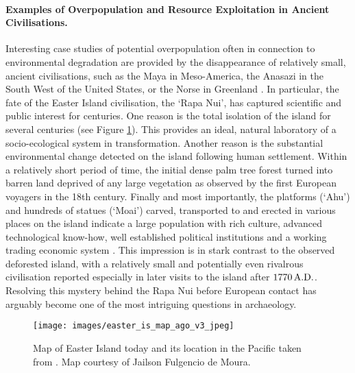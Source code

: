 \paragraph{Examples of Overpopulation and Resource Exploitation in Ancient Civilisations.}
Interesting case studies of potential overpopulation often in connection to environmental degradation are provided by the disappearance of relatively small, ancient civilisations, such as the Maya in Meso-America, the Anasazi in the South West of the United States, or the Norse in Greenland \citep{Diamond2011}.
In particular, the fate of the Easter Island civilisation, the `Rapa Nui', has captured scientific and public interest for centuries.
One reason is the total isolation of the island for several centuries (see Figure \ref{fig:Karte}).
This provides an ideal, natural laboratory of a socio-ecological system in transformation. 
Another reason is the substantial environmental change detected on the island following human settlement.  
Within a relatively short period of time, the initial dense palm tree forest turned into barren land deprived of any large vegetation as observed by the first European voyagers in the 18th century.
Finally and most importantly, the platforms (`Ahu') and hundreds of statues (`Moai') carved, transported to and erected in various places on the island indicate a large population with rich culture, advanced technological know-how, well established political institutions and a working trading economic system \citep{Cauwe2011}.
This impression is in stark contrast to the observed deforested island, with a relatively small and potentially even rivalrous civilisation reported especially in later visits to the island after $1770\, {\rm A.D.}$.
Resolving this mystery behind the Rapa Nui before European contact has arguably become one of the most intriguing questions in archaeology.


\begin{figure}
	\centering
	\texttt{[image: images/easter\_is\_map\_ago\_v3\_jpeg]}
	\caption{Map of Easter Island today and its location in the Pacific taken from \citet{Merico2017}. Map courtesy of Jailson Fulgencio de Moura.}
	\label{fig:Karte}
\end{figure}

